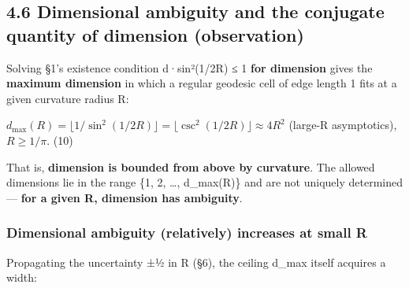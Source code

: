 \documentclass[
]{ltjsarticle}
\begin{document}
\subsection{4.6 Dimensional ambiguity and the conjugate quantity of
dimension
(observation)}\label{dimensional-ambiguity-and-the-conjugate-quantity-of-dimension-observation}

Solving §1's existence condition d·sin²(1/2R) ≤ 1 \textbf{for dimension}
gives the \textbf{maximum dimension} in which a regular geodesic cell of
edge length 1 fits at a given curvature radius R:

\(d_{\max}(R) = \lfloor 1/\sin^2(1/2R)\rfloor = \lfloor \csc^2(1/2R)\rfloor \approx 4R^2\)
(large-R asymptotics), \(R \ge 1/\pi\). (10)

That is, \textbf{dimension is bounded from above by curvature}. The
allowed dimensions lie in the range \{1, 2, \ldots, d\_max(R)\} and are
not uniquely determined --- \textbf{for a given R, dimension has
ambiguity}.

\subsubsection{Dimensional ambiguity (relatively) increases at small
R}\label{dimensional-ambiguity-relatively-increases-at-small-r}

Propagating the uncertainty ±½ in R (§6), the ceiling d\_max itself
acquires a width:
\end{document}
